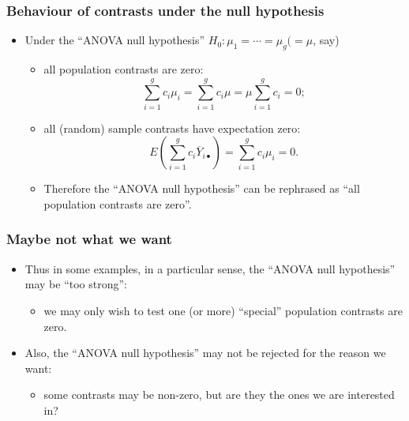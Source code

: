 \documentclass[a4paper]{article}\usepackage[]{graphicx}\usepackage[]{xcolor}
\begin{document}
\subsubsection{Behaviour of contrasts under the null hypothesis}
\begin{itemize}
	\item Under the ``ANOVA null hypothesis'' \( H_0: \mu_1 = \dotsb = \mu_g (=\mu \), say)
	\begin{itemize}
		\item all population contrasts are zero:
		\[
			\sum_{i=1}^gc_i\mu_i=\sum_{i=1}^gc_i\mu=\mu\sum_{i=1}^gc_i=0;
		\]
		\item all (random) sample contrasts have expectation zero:
		\[
			E \left( \sum_{i=1}^gc_i\overline Y_{i\bullet}\right)=\sum_{i=1}^gc_i\mu_i=0.
		\]
		\item Therefore the ``ANOVA null hypothesis'' can be rephrased as ``all population contrasts are zero''.
	\end{itemize}
\end{itemize}
\subsubsection{Maybe not what we want}
\begin{itemize}
	\item Thus in some examples, in a particular sense, the ``ANOVA null hypothesis'' may be ``too strong'':
	\begin{itemize}
		\item we may only wish to test one (or more) ``special'' population contrasts are zero.
	\end{itemize}
	\item Also, the ``ANOVA null hypothesis'' may not be rejected for the reason we want:
	\begin{itemize}
		\item some contrasts may be non-zero, but are they the ones we are interested in?
	\end{itemize}
\end{itemize}
\end{document}

